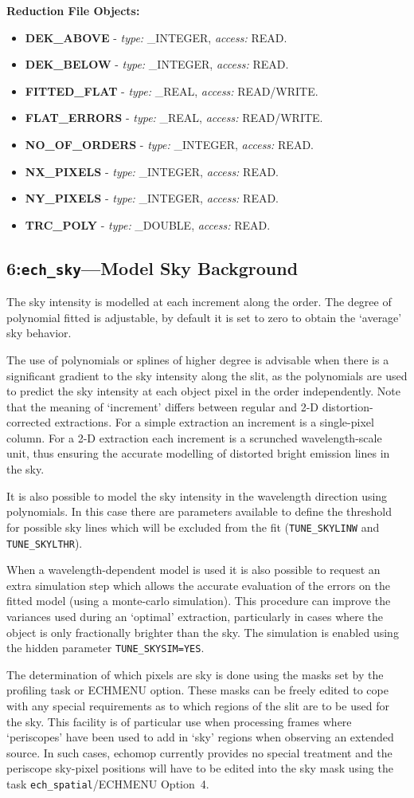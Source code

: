 \documentclass[11pt,twoside]{article}
\makeatletter
\newcommand{\stardocinitials}  {SUN}
\newcommand{\stardocnumber}    {152.4}
\newcommand{\stardocname}{\stardocinitials /\stardocnumber}
\newcommand{\htmlref}[2]{#1}
\newcommand{\xlabel}[1]{}
\newcommand{\myindex}[1]{\index{#1}}
\newcommand{\indexcmdname}[1]{\index{#1@\protect\cmdname{#1}}}
\renewcommand{\myindex}[1]{}
\renewcommand{\indexcmdname}[1]{}
\newcommand{\cmdname}{\begingroup \catcode`\_=12 \realcmdname}
\newcommand{\realcmdname}[1]{\endgroup\texttt{#1}}
\newlength{\sstbannerlength}
\newlength{\sstcaptionlength}
\newcommand{\echtask}[4]{
   \goodbreak
   \rule{\textwidth}{0.5mm}
   \vspace{-7ex}
   \newline
   \settowidth{\sstbannerlength}{{\Large {\bf #3}}}
   \setlength{\sstcaptionlength}{\textwidth}
   \addtolength{\sstbannerlength}{0.5em}
   \addtolength{\sstcaptionlength}{-2.0\sstbannerlength}
   \addtolength{\sstcaptionlength}{-5.0pt}
   \parbox[t]{\sstbannerlength}{\flushleft{\Large {\bf #3}}}
   \parbox[t]{\sstcaptionlength}{\center{\Large #4}}
   \parbox[t]{\sstbannerlength}{\flushright{\Large {\bf #3}}}
   \label{#1}\label{#2}
   \markboth{#3}{\stardocname}
   \uppercase{\myindex{#2@\protect\cmdname{#2}}}
}
\renewcommand{\echtask}[4]
{
  \subsection{\xlabel{#1}\xlabel{#2}\label{#1}\label{#2}#3---#4}
  \markboth{#3}{\stardocname}
}
\newcommand{\echredobj}[1]{
{\bf Reduction File Objects:\vspace*{6pt}\\}
      \hspace*{5mm}\makebox[50mm][l]{Object}\makebox[25mm][l]{Type}{Access}\\
      #1
}
\renewcommand{\echredobj}[1]{
{\bf Reduction File Objects:}
\begin{itemize}
#1
\end{itemize}
}
\newcommand{\eobj}[3]
{
    \hspace*{5mm}\makebox[50mm][l]{\bf #1}\makebox[25mm][l]{\tt #2}{\tt #3}\\
}
\renewcommand{\eobj}[3]
{\item {\bf #1} - {\it type:} #2, {\it access:} #3.}
\newcommand{\leobj}[3]
{
    \hspace*{5mm}\makebox[50mm][l]{\bf #1}\makebox[25mm][l]{\tt #2}{\tt #3}
}
\renewcommand{\leobj}[3]
{\item {\bf #1} - {\it type:} #2, {\it access:} #3.}
\makeatother
\begin{document}
\echredobj{
\eobj{DEK\_ABOVE}{\_INTEGER}{READ}
\eobj{DEK\_BELOW}{\_INTEGER}{READ}
\eobj{FITTED\_FLAT}{\_REAL}{READ/WRITE}
\eobj{FLAT\_ERRORS}{\_REAL}{READ/WRITE}
\eobj{NO\_OF\_ORDERS}{\_INTEGER}{READ}
\eobj{NX\_PIXELS}{\_INTEGER}{READ}
\eobj{NY\_PIXELS}{\_INTEGER}{READ}
\leobj{TRC\_POLY}{\_DOUBLE}{READ}
}

\echtask{option6}{ech_sky}{6:{\tt ech\_sky}}{Model Sky Background}
\myindex{Sky!subtraction}

The sky intensity is modelled at each increment along the order.
The degree of polynomial fitted is adjustable, by default it is set to zero
to obtain the `average' sky behavior.

The use of polynomials or splines of higher degree is advisable when there
is a significant gradient to the sky intensity along the slit, as the
polynomials are used to predict the sky intensity at each object pixel
in the order independently.
Note that the meaning of `increment' differs between regular and 2-D
distortion-corrected extractions.
For a simple extraction an increment is a single-pixel column.
For a 2-D extraction each increment is a scrunched wavelength-scale unit,
thus ensuring the accurate modelling of distorted bright emission lines
in the sky.

It is also possible to model the sky intensity in the wavelength
direction using polynomials.
In this case there are parameters available to define the threshold for
possible sky lines which will be excluded from the fit
(\htmlref{{\tt{TUNE\_SKYLINW}}}{par_TUNE_SKYLINW} and
\htmlref{{\tt TUNE\_SKYLTHR}}{par_TUNE_SKYLTHR}).
\indexcmdname{TUNE_SKYLINW}
\indexcmdname{TUNE_SKYLTHR}
\myindex{Sky!noise simulation}
\indexcmdname{TUNE_SKYSIM}
When a wavelength-dependent model is used it is also possible to request
an extra simulation step which allows the accurate evaluation of the
errors on the fitted model (using a monte-carlo simulation). This
procedure can improve the variances used during an `optimal' extraction,
particularly in cases where the object is only fractionally brighter
than the sky.
The simulation is enabled using the hidden parameter
\htmlref{{\tt TUNE\_SKYSIM=YES}}{par_TUNE_SKYSIM}.

The determination of which pixels are sky is done using the masks
set by the profiling task or ECHMENU option.
These masks can be freely edited to cope with any special requirements as
to which regions of the slit are to be used for the sky.
This facility is of particular use when processing frames where
`periscopes' have been used to add in `sky' regions when observing an
extended source.
In such cases, {\sc echomop} currently provides no special
treatment and the periscope sky-pixel positions will have to be edited
into the sky mask using the task \htmlref{{\tt ech\_spatial}/ECHMENU
Option~4}{ech_spatial}.
\indexcmdname{ECH_SPATIAL}
\end{document}

